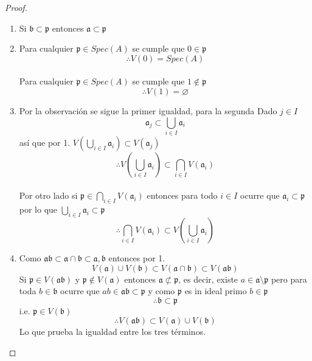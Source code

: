 \documentclass[14pt]{extarticle}
\begin{document}
\begin{proof}
    \begin{enumerate}
        \item Si $\mathfrak{b} \subset \mathfrak{p}$ entonces $\mathfrak{a} \subset \mathfrak{p}$
    
        \item Para cualquier $\mathfrak{p} \in Spec(A)$ se cumple que $0 \in \mathfrak{p}$
        $$\therefore V(0)=Spec(A)$$
        \\
        Para cualquier $\mathfrak{p} \in Spec(A)$ se cumple que $1 \notin \mathfrak{p}$
        $$\therefore V(1)=\varnothing$$

        \item Por la observación se sigue la primer igualdad, para la segunda 
        Dado $j\in I $ 
        $$\mathfrak{a}_j \subset \bigcup_{i\in I} \mathfrak{a}_i$$ así que por 1.
        $V(\bigcup_{i\in I}\mathfrak{a}_i) \subset V(\mathfrak{a}_j)$
        $$\therefore V(\bigcup_{i\in I}\mathfrak{a}_i) \subset \bigcap_{i \in I} V(\mathfrak{a}_i)$$
        \\
        Por otro lado si $\mathfrak{p} \in \bigcap_{i \in I} V(\mathfrak{a}_i)$ entonces
        para todo $i\in I$ ocurre que $\mathfrak{a}_i \subset \mathfrak{p}$\\
        por lo que $\bigcup_{i\in I} \mathfrak{a}_i \subset \mathfrak{p}$
        $$\therefore \bigcap_{i \in I} V(\mathfrak{a}_i) \subset V(\bigcup_{i\in I}\mathfrak{a}_i)$$

        
        \item Como $\mathfrak{a} \mathfrak{b} \subset \mathfrak{a}\cap \mathfrak{b}\subset \mathfrak{a}, \mathfrak{b}$ entonces por 1.
        $$V(\mathfrak{a}) \cup V(\mathfrak{b}) \subset V(\mathfrak{a}\cap \mathfrak{b}) \subset V(\mathfrak{a} \mathfrak{b})$$
        Si $\mathfrak{p} \in V(\mathfrak{a} \mathfrak{b})$ y $\mathfrak{p}\notin V(\mathfrak{a})$ entonces $\mathfrak{a} \not\subset \mathfrak{p}$,
        es decir, existe $a\in \mathfrak{a} \setminus \mathfrak{p}$ pero para toda $b \in \mathfrak{b}$ ocurre que
        $ab \in \mathfrak{a} \mathfrak{b} \subset \mathfrak{p}$ y como $\mathfrak{p}$ es in ideal primo $b \in \mathfrak{p}$
        $$\therefore \mathfrak{b} \subset \mathfrak{p}$$ i.e. $\mathfrak{p} \in V(\mathfrak{b})$
        $$\therefore V(\mathfrak{a} \mathfrak{b}) \subset V(\mathfrak{a}) \cup V(\mathfrak{b})$$
        Lo que prueba la igualdad entre los tres términos.
    \end{enumerate}
\end{proof}
\end{document}
